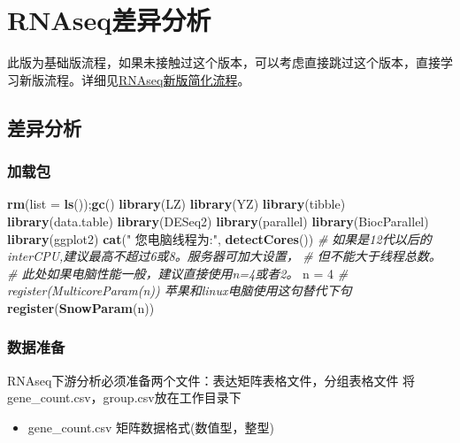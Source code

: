 \documentclass[
]{book}
\newenvironment{Shaded}{\begin{snugshade}}{\end{snugshade}}
\newcommand{\AttributeTok}[1]{\textcolor[rgb]{0.13,0.29,0.53}{#1}}
\newcommand{\CommentTok}[1]{\textcolor[rgb]{0.56,0.35,0.01}{\textit{#1}}}
\newcommand{\DecValTok}[1]{\textcolor[rgb]{0.00,0.00,0.81}{#1}}
\newcommand{\FunctionTok}[1]{\textcolor[rgb]{0.13,0.29,0.53}{\textbf{#1}}}
\newcommand{\NormalTok}[1]{#1}
\newcommand{\OtherTok}[1]{\textcolor[rgb]{0.56,0.35,0.01}{#1}}
\newcommand{\StringTok}[1]{\textcolor[rgb]{0.31,0.60,0.02}{#1}}
\providecommand{\tightlist}{%
  \setlength{\itemsep}{0pt}\setlength{\parskip}{0pt}}
\begin{document}
\chapter{RNAseq差异分析}\label{deg}

此版为基础版流程，如果未接触过这个版本，可以考虑直接跳过这个版本，直接学习新版流程。详细见\hyperref[rnaseq_new_pipeline]{RNAseq新版简化流程}。

\section{差异分析}\label{deg-mian}

\subsection{加载包}\label{ux52a0ux8f7dux5305}

\begin{Shaded}
\begin{Highlighting}[]
\FunctionTok{rm}\NormalTok{(}\AttributeTok{list =} \FunctionTok{ls}\NormalTok{());}\FunctionTok{gc}\NormalTok{()}
\FunctionTok{library}\NormalTok{(LZ)}
\FunctionTok{library}\NormalTok{(YZ)}
\FunctionTok{library}\NormalTok{(tibble)}
\FunctionTok{library}\NormalTok{(data.table)}
\FunctionTok{library}\NormalTok{(DESeq2)}
\FunctionTok{library}\NormalTok{(parallel)}
\FunctionTok{library}\NormalTok{(BiocParallel)}
\FunctionTok{library}\NormalTok{(ggplot2)}
\FunctionTok{cat}\NormalTok{(}\StringTok{" 您电脑线程为:"}\NormalTok{, }\FunctionTok{detectCores}\NormalTok{())}
\CommentTok{\# 如果是12代以后的interCPU,建议最高不超过6或8。服务器可加大设置，}
\CommentTok{\#  但不能大于线程总数。}
\CommentTok{\# 此处如果电脑性能一般，建议直接使用n=4或者2。}
\NormalTok{n }\OtherTok{=} \DecValTok{4}
\CommentTok{\# register(MulticoreParam(n)) 苹果和linux电脑使用这句替代下句}
\FunctionTok{register}\NormalTok{(}\FunctionTok{SnowParam}\NormalTok{(n))}
\end{Highlighting}
\end{Shaded}

\subsection{数据准备}\label{ux6570ux636eux51c6ux5907}

RNAseq下游分析必须准备两个文件：表达矩阵表格文件，分组表格文件
将gene\_count.csv，group.csv放在工作目录下

\begin{itemize}
\tightlist
\item
  gene\_count.csv 矩阵数据格式(数值型，整型)
\end{itemize}
\end{document}
